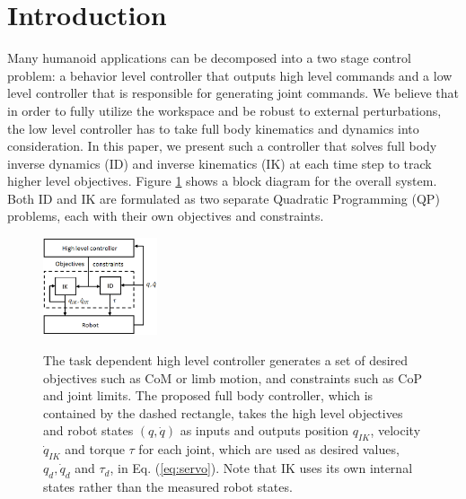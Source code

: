 \documentclass{ws-ijhr}
\newcommand{\eref}[1] {Eq. (\ref{#1})}
\newcommand{\fref}[1] {Figure \ref{#1}}
\begin{document}


\section{Introduction}
Many humanoid applications can be decomposed into a two stage control problem: a 
behavior level controller that outputs high level commands and a low level 
controller that is responsible for generating joint commands. We believe that in order
to fully utilize the workspace and be robust to external perturbations, the low 
level controller has to take full body kinematics and dynamics into consideration. 
In this paper, we present such a controller that solves full body inverse 
dynamics (ID) and inverse kinematics (IK) at each time step to track higher level 
objectives. \fref{fig:sys} shows a block diagram for the 
overall system. 
Both ID and IK are formulated as two separate 
Quadratic Programming (QP) problems, each with their own objectives and 
constraints. 

\begin{figure}
  \begin{center}
    {\includegraphics[width=0.3\textwidth]{images/sys.eps}}
    \caption{
      The task dependent high level controller generates a set of desired 
      objectives such as CoM or limb motion, and constraints such as CoP and 
      joint limits. The proposed full body controller, which is contained by
      the dashed rectangle, takes the high level objectives and robot states 
      $(q,\dot{q})$ as inputs and outputs position $q_{IK}$, velocity 
      $\dot{q}_{IK}$ and torque $\tau$ for each joint, which are used as 
      desired values, $q_d, \dot{q}_d$ and $\tau_d$, in \eref{eq:servo}. Note that IK uses its 
      own internal states rather than the measured robot states. 
      }\label{fig:sys} 
  \end{center}
\end{figure}  
 
\end{document}
